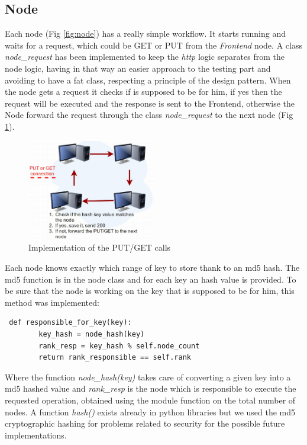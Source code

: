 \documentclass[11pt,conference]{IEEEtran}
\begin{document}
\subsection{Node}

Each node (Fig \ref{fig:node}) has a really simple workflow. It starts running and waits for a request, which could be GET or PUT from the \textit{Frontend} node. A class \textit{node\_request} has been implemented to keep the \textit{http} logic separates from the node logic, having in that way an easier approach to the testing part and avoiding to have a fat class, respecting a principle of the design pattern.
When the node gets a request it checks if is supposed to be for him, if yes then the request will be executed and the response is sent to the Frontend, otherwise the Node forward the request through the class \textit{node\_request} to the next node (Fig \ref{fig:putget}).

\begin{figure}[h!]
  \centering
    \includegraphics[width=0.5\textwidth]{putget}
    \caption{Implementation of the PUT/GET calls}
    \label{fig:putget}
\end{figure}

Each node knows exactly which range of key to store thank to an md5 hash. The md5 function is in the node class and for each key an hash value is provided.
To be sure that the node is working on the key that is supposed to be for him, this method was implemented:

\begin{lstlisting}
 def responsible_for_key(key):
        key_hash = node_hash(key)
        rank_resp = key_hash % self.node_count
        return rank_responsible == self.rank
\end{lstlisting}
Where the function \textit{node\_hash(key)} takes care of converting a given key into a md5 hashed value and \textit{rank\_resp} is the node which is responsible to execute the requested operation, obtained using the module function on the total number of nodes.
\newline
A function \textit{hash()} exists already in python libraries but we used the md5 cryptographic hashing for problems related to security for the possible future implementations.
\end{document}
